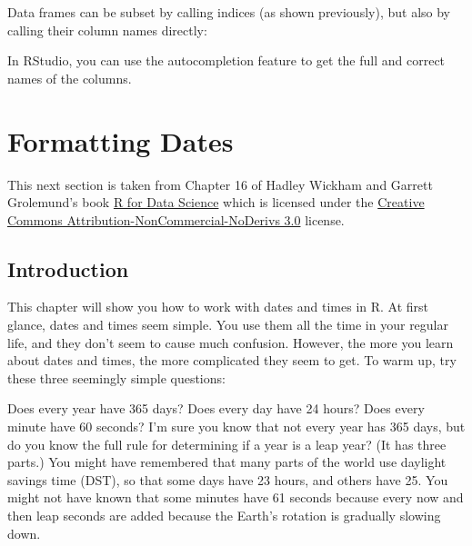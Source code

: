 \documentclass[]{book}
\newenvironment{Shaded}{\begin{snugshade}}{\end{snugshade}}
\newcommand{\StringTok}[1]{\textcolor[rgb]{0.31,0.60,0.02}{#1}}
\newcommand{\CommentTok}[1]{\textcolor[rgb]{0.56,0.35,0.01}{\textit{#1}}}
\newcommand{\OperatorTok}[1]{\textcolor[rgb]{0.81,0.36,0.00}{\textbf{#1}}}
\newcommand{\NormalTok}[1]{#1}
\begin{document}
Data frames can be subset by calling indices (as shown previously), but
also by calling their column names directly:

\begin{Shaded}
\end{Shaded}

In RStudio, you can use the autocompletion feature to get the full and
correct names of the columns.

\section{Formatting Dates}\label{formatting-dates}

This next section is taken from Chapter 16 of Hadley Wickham and Garrett
Grolemund's book \href{https://r4ds.had.co.nz/dates-and-times.html}{R
for Data Science} which is licensed under the
\href{https://creativecommons.org/licenses/by-nc-nd/3.0/us/}{Creative
Commons Attribution-NonCommercial-NoDerivs 3.0} license.

\subsection{Introduction}\label{introduction-1}

This chapter will show you how to work with dates and times in R. At
first glance, dates and times seem simple. You use them all the time in
your regular life, and they don't seem to cause much confusion. However,
the more you learn about dates and times, the more complicated they seem
to get. To warm up, try these three seemingly simple questions:

Does every year have 365 days? Does every day have 24 hours? Does every
minute have 60 seconds? I'm sure you know that not every year has 365
days, but do you know the full rule for determining if a year is a leap
year? (It has three parts.) You might have remembered that many parts of
the world use daylight savings time (DST), so that some days have 23
hours, and others have 25. You might not have known that some minutes
have 61 seconds because every now and then leap seconds are added
because the Earth's rotation is gradually slowing down.
\end{document}
